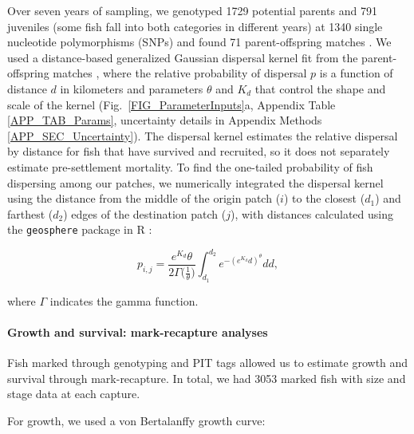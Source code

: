 \documentclass[12pt, oneside]{article}   	%
\begin{document}
Over seven years of sampling, we genotyped 1729 potential parents and 791 juveniles (some fish fall into both categories in different years) at 1340 single nucleotide polymorphisms (SNPs) and found 71 parent-offspring matches \citep{catalanoInPrepconnectivity}. We used a distance-based generalized Gaussian dispersal kernel fit from the parent-offspring matches \citep{catalanoInPrepconnectivity, bode2018estimating}, where the relative probability of dispersal $p$ is a function of distance $d$ in kilometers and parameters $\theta$ and $K_d$ that control the shape and scale of the kernel (Fig.\ \ref{FIG_ParameterInputs}a, Appendix Table \ref{APP_TAB_Params}, uncertainty details in Appendix Methods \ref{APP_SEC_Uncertainty}). The dispersal kernel estimates the relative dispersal by distance for fish that have survived and recruited, so it does not separately estimate pre-settlement mortality. To find the one-tailed probability of fish dispersing among our patches, we numerically integrated the dispersal kernel using the distance from the middle of the origin patch ($i$) to the closest ($d_1$) and farthest ($d_2$) edges of the destination patch ($j$), with distances calculated using the \texttt{geosphere} package in R \citep{geosphere2017R}:

\begin{equation} %
p_{i,j} = \frac{e^{K_d}\theta}{2\Gamma({\frac{1}{\theta})}} \int_{d_1}^{d_2}e^{-(e^{K_d}d)^\theta}  dd, \label{EQN_integratingDK}
\end{equation}

where $\Gamma$ indicates the gamma function.

\paragraph*{Growth and survival: mark-recapture analyses}

Fish marked through genotyping and PIT tags allowed us to estimate growth and survival through mark-recapture. In total, we had 3053 marked fish with size and stage data at each capture. 

For growth, we used a von Bertalanffy growth curve:
\end{document}
